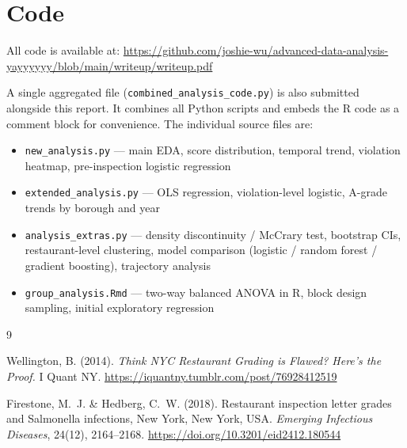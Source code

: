 \documentclass[11pt, twocolumn]{article}
\begin{document}
\section{Code}

All code is available at:
\url{https://github.com/joshie-wu/advanced-data-analysis-yayyyyyy/blob/main/writeup/writeup.pdf}

A single aggregated file (\texttt{combined\_analysis\_code.py}) is also
submitted alongside this report. It combines all Python scripts and
embeds the R code as a comment block for convenience. The individual
source files are:

\begin{itemize}
  \item \texttt{new\_analysis.py} — main EDA, score distribution, temporal trend,
    violation heatmap, pre-inspection logistic regression
  \item \texttt{extended\_analysis.py} — OLS regression, violation-level logistic,
    A-grade trends by borough and year
  \item \texttt{analysis\_extras.py} — density discontinuity / McCrary test,
    bootstrap CIs, restaurant-level clustering, model comparison (logistic /
    random forest / gradient boosting), trajectory analysis
  \item \texttt{group\_analysis.Rmd} — two-way balanced ANOVA in R,
    block design sampling, initial exploratory regression
\end{itemize}

\begin{thebibliography}{9}

  Wellington, B. (2014).
  \textit{Think NYC Restaurant Grading is Flawed? Here's the Proof.}
  I Quant NY. \url{https://iquantny.tumblr.com/post/76928412519}

  Firestone, M.~J. \& Hedberg, C.~W. (2018).
  Restaurant inspection letter grades and Salmonella infections,
  New York, New York, USA.
  \textit{Emerging Infectious Diseases}, 24(12), 2164--2168.
  \url{https://doi.org/10.3201/eid2412.180544}

\end{thebibliography}
\end{document}
